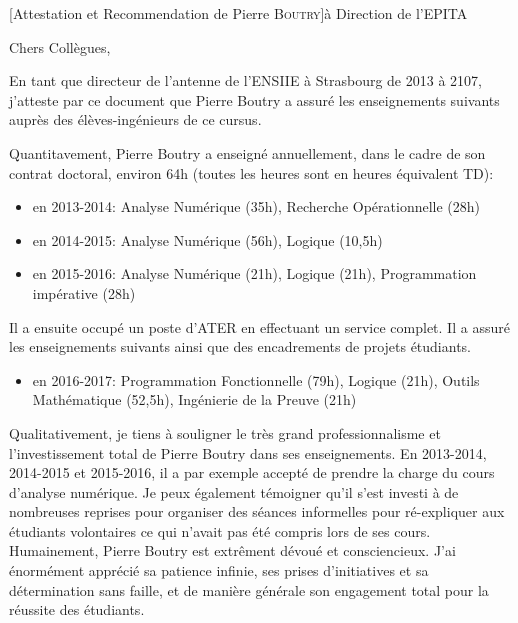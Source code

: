 \documentclass[a4paper,10pt]{article}
\begin{document}

	  \vspace{-.5cm}

\begin{letter}[Attestation et Recommendation de Pierre \textsc{Boutry}]{à}%
	  {Direction de l'EPITA}

	  \vspace{-1cm}

Chers Collègues,

En tant que directeur de l'antenne de l'ENSIIE à Strasbourg de 2013 à 2107,
j'atteste par ce document que Pierre Boutry a assuré les enseignements suivants
auprès des élèves-ingénieurs de ce cursus.

\noindent 
Quantitavement, Pierre Boutry a enseigné annuellement, dans le cadre de son contrat doctoral, environ 64h (toutes les heures
sont en heures équivalent TD):
\begin{itemize}
	  \item  en 2013-2014: Analyse Numérique (35h), Recherche Opérationnelle (28h)
	  \item  en 2014-2015: Analyse Numérique (56h), Logique (10,5h)
	  \item  en 2015-2016:  Analyse Numérique (21h), Logique (21h), Programmation impérative (28h)
\end{itemize}

\smallskip

\noindent Il a ensuite occupé un poste d'ATER en effectuant un service complet. Il a assuré les
enseignements suivants ainsi que des encadrements de projets étudiants.
\begin{itemize}
	  \item  en 2016-2017:  Programmation Fonctionnelle (79h), Logique (21h), 
		    Outils Mathématique (52,5h), Ingénierie de la Preuve (21h)
\end{itemize}

\bigskip

\noindent Qualitativement, je tiens à souligner le très grand professionnalisme et l'investissement total
de Pierre Boutry dans ses enseignements. 
%
En 2013-2014, 2014-2015 et 2015-2016, il a par exemple accepté de prendre la charge du 
cours d'analyse numérique. Je peux également témoigner qu'il s'est investi à de nombreuses
reprises pour organiser des séances informelles pour ré-expliquer aux étudiants volontaires
ce qui n'avait pas été compris lors de ses cours. Humainement, Pierre Boutry est 
extrêment dévoué et consciencieux. J'ai énormément apprécié sa patience infinie, ses prises d'initiatives
et sa détermination sans faille, et de manière générale son engagement total pour la réussite 
des étudiants.


\end{letter}
\end{document}
